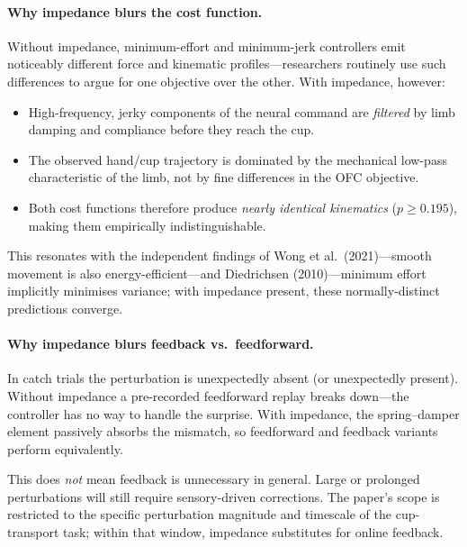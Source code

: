\documentclass[11pt]{article}
\begin{document}
\paragraph{Why impedance blurs the cost function.}
Without impedance, minimum-effort and minimum-jerk controllers emit noticeably different force and kinematic profiles---researchers routinely use such differences to argue for one objective over the other.  With impedance, however:
\begin{itemize}[leftmargin=1.2em,topsep=2pt]
  \item High-frequency, jerky components of the neural command are \emph{filtered} by limb damping and compliance before they reach the cup.
  \item The observed hand/cup trajectory is dominated by the mechanical low-pass characteristic of the limb, not by fine differences in the OFC objective.
  \item Both cost functions therefore produce \emph{nearly identical kinematics} ($p\geq 0.195$), making them empirically indistinguishable.
\end{itemize}
This resonates with the independent findings of Wong et al.\ (2021)---smooth movement is also energy-efficient---and Diedrichsen (2010)---minimum effort implicitly minimises variance; with impedance present, these normally-distinct predictions converge.

\paragraph{Why impedance blurs feedback vs.\ feedforward.}
In catch trials the perturbation is unexpectedly absent (or unexpectedly present).  Without impedance a pre-recorded feedforward replay breaks down---the controller has no way to handle the surprise.  With impedance, the spring--damper element passively absorbs the mismatch, so feedforward and feedback variants perform equivalently.

This does \emph{not} mean feedback is unnecessary in general.  Large or prolonged perturbations will still require sensory-driven corrections.  The paper's scope is restricted to the specific perturbation magnitude and timescale of the cup-transport task; within that window, impedance substitutes for online feedback.
\end{document}
